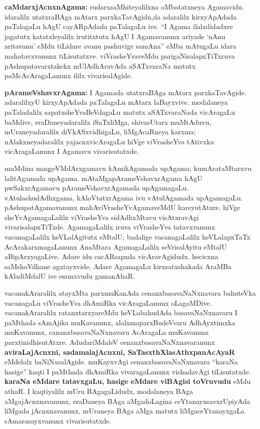 \vskip 2pt

\textbf{caMdarxjAcnxnAgama:} rudarxsaMhiteyalilxna oMbatatxneya Agamavidu. idaralilx utatxraBAga mAtarx parxkaTavAgidu,da adaralilx kirxyApAdada  paTalagaLu hAgU cayARpAdada  paTalagaLu ive. ``I Agama ilalxdidadxre jagatutx katatxleyalilx irutitxtutx hAgU I Agamavanunx ariyade `nAnu aritavanu' eMdu tiLidare avanu pashuvige samAna'' eMba mAtugaLu idara mahatavxvanunx tiLisutatxve. viVrasheYvaveMdu parigaNisalapxTiTxruva pAshupatavarxtakekx mUlAdhAravAda aSATxvaraNa matutx paMcAcAragaLanunx ililx vivarisalAgide.

\vskip 2pt

\textbf{pArameVshavxrAgama:} I Agamada utatxraBAga mAtarx parxkaTavAgide. adaralilxyU kirxyApAdada  paTalagaLu mAtarx laBayxvive. modalaneya paTaladalilx sapatxsheYvaBeVdagaLu matutx aSATxvaraNada vicAragaLu baMdive, eraDaneyadaralilx iSaTxliMga, shivasUtarx muMtAduvu, mUraneyadaralilx diVkASxvidhigaLu, liMgAcaRneya karxma; nAlakxneyadaralilx yajacnxvicAragaLu hiVge viVrasheYva tAtivxka vicAragaLanunx I Agamavu vivarisutatxde.

\vskip 2pt

muMdina maqgeVMdArxgamavu kAmikAgamada upAgama; kumArataMtarxvu lalitAgamada upAgama. mAtaMgapArameVshavxrA\-gama hAgU pwSakxrAgamavu pArameVshavxrAgamada upAgamagaLu. vAtulashudAdhxgama, kAloVtatxrAgama ivu vAtulAgamada upAgamagaLu. pAshupatAgamavanunx mahAviVrasheYvAgamaveMdU kareyutAtxre. hiVge sheYvAgamagaLalilx viVrasheYva sidAdhxMtavu visAtxravAgi vivarisalapxTiTxde. AgamagaLalilx iruva viVrasheYva tatavxvanunx vacanagaLalilx heVLalAgitutx eMtalU; badalige vacanagaLalilx heVLalapxTaTx AcArakarxmagaLanunx AnaMtara AgamagaLalilx seVrisalAyitu eMtalU aBipArxyagaLive. Adare idu cacARsapxda vicAra\-vAgidudx. hecicxna saMshoVdhane agatayxvide. Adare AgamagaLu kirxsatxshakada AraMBa kAladiMdalU ive enunxvudu gamanAhaR.

vacanakAraralilx atayxMta parxmuKanAda cenanxbasavaNaNxnavara bahuteVka vacanagaLu viVrasheYva dhAmiRka vicAragaLanunx oLagoMDive. vacanakAraralilx ratanxtarxyareMdu heVLabahudAda basavaNaNxnavaru I paMthada sAmAjika muKavanunx, alalxmaparxBudeVvaru AdhAyxtimxka muKavanunx, cananxbasavaNaNxnavaru AcAragaLa muKavanunx parxtinidhisutAtxre. AdudariMdaleV cenanxbasavaNaNxnavaranunx \textbf{aviraLajAcnxni, sadamalajAcnxni, SaTasxthXlasAthxpanAcAyaR} eMdelalx baNiNxsalAgide. muKayxvAgi cenanxbasavaNaNxnavara ``karaNa hasige'' kaqti I paMthada dhAmiRka vivaragaLanunx vishadavAgi tiLisutatxde.  \textbf{karaNa eMdare tatavxgaLu, hasige eMdare viBAgisi toVruvudu} eMdu athaR. I kaqtiyalilx mUru BAgagaLidudx, modalaneya BAga aMgajAcnxnavanunx, eraDaneya BAga aMgadoLagina ceYtanayxsavxrUpiyAda liMgada jAcnxnavanunx, mUraneya BAga aMga matutx liMgaceYtanayxgaLa sAmarasayxvanunx vivarisutatxde.

